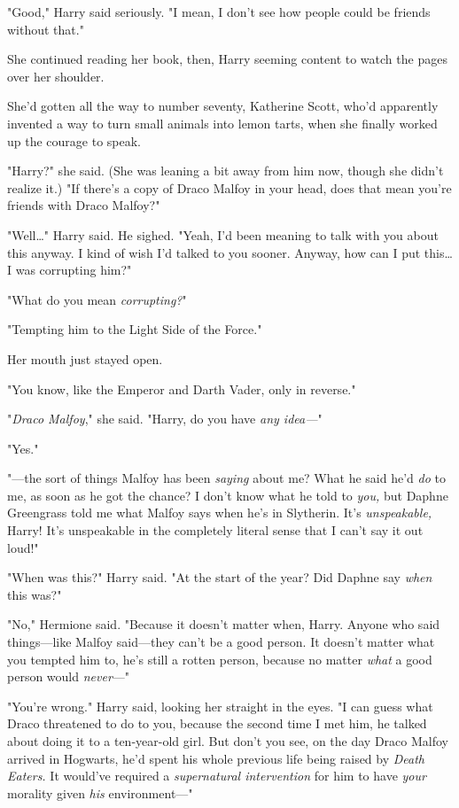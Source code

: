 "Good," Harry said seriously. "I mean, I don't see how people could be friends
without that."

She continued reading her book, then, Harry seeming content to watch the pages
over her shoulder.

She'd gotten all the way to number seventy, Katherine Scott, who'd apparently
invented a way to turn small animals into lemon tarts, when she finally worked
up the courage to speak.

"Harry?" she said. (She was leaning a bit away from him now, though she didn't
realize it.) "If there's a copy of Draco Malfoy in your head, does that mean
you're friends with Draco Malfoy?"

"Well{\ldots}" Harry said. He sighed. "Yeah, I'd been meaning to talk with you
about this anyway. I kind of wish I'd talked to you sooner. Anyway, how can I
put this{\ldots} I was corrupting him?"

"What do you mean \emph{corrupting?}"

"Tempting him to the Light Side of the Force."

Her mouth just stayed open.

"You know, like the Emperor and Darth Vader, only in reverse."

"\emph{Draco Malfoy}," she said. "Harry, do you have \emph{any idea---}"

"Yes."

"---the sort of things Malfoy has been \emph{saying} about me? What he said
he'd \emph{do} to me, as soon as he got the chance? I don't know what he told
to \emph{you,} but Daphne Greengrass told me what Malfoy says when he's in
Slytherin. It's \emph{unspeakable,} Harry! It's unspeakable in the completely
literal sense that I can't say it out loud!"

"When was this?" Harry said. "At the start of the year? Did Daphne say
\emph{when} this was?"

"No," Hermione said. "Because it doesn't matter when, Harry. Anyone who said
things---like Malfoy said---they can't be a good person. It doesn't matter what
you tempted him to, he's still a rotten person, because no matter \emph{what} a
good person would \emph{never}---"

"You're wrong." Harry said, looking her straight in the eyes. "I can guess what
Draco threatened to do to you, because the second time I met him, he talked
about doing it to a ten-year-old girl. But don't you see, on the day Draco
Malfoy arrived in Hogwarts, he'd spent his whole previous life being raised by
\emph{Death Eaters.} It would've required a \emph{supernatural intervention}
for him to have \emph{your} morality given \emph{his} environment---"

